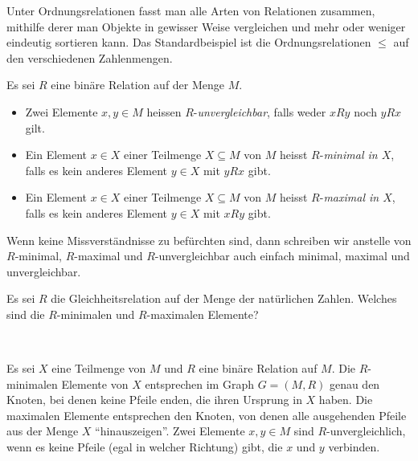     Unter Ordnungsrelationen fasst man alle Arten von Relationen zusammen, mithilfe derer man
    Objekte in gewisser Weise vergleichen und mehr oder weniger eindeutig sortieren kann. Das
    Standardbeispiel ist die Ordnungsrelationen $\leq$ auf den verschiedenen Zahlenmengen.

    \begin{df}\label{df:minimale elemente}
    Es sei $R$ eine binäre Relation auf der Menge $M$.
    \begin{itemize}
    \item Zwei Elemente $x,y\in M$ heissen $R$-\textit{unvergleichbar}, falls weder $xRy$ noch $yRx$ gilt.
    \item Ein Element $x\in X$ einer Teilmenge $X\subseteq M$ von $M$ heisst $R$-\textit{minimal in $X$}, falls es kein anderes Element $y\in X$ mit $yRx$ gibt.
    \item  Ein Element $x\in X$ einer Teilmenge $X\subseteq M$ von $M$ heisst $R$-\textit{maximal in $X$}, falls es kein anderes Element $y\in X$ mit $xRy$ gibt.
    \end{itemize}
    Wenn keine Missverständnisse zu befürchten sind, dann schreiben wir anstelle von $R$-minimal, $R$-maximal und $R$-unvergleichbar auch einfach minimal, maximal und unvergleichbar.
    \end{df}

    \begin{ueb}
        Es sei $R$ die Gleichheitsrelation auf der Menge der natürlichen Zahlen. Welches sind die $R$-minimalen und $R$-maximalen Elemente?
    \end{ueb}
    \begin{lsg}~
    \end{lsg}

    \begin{rk}
        Es sei $X$ eine Teilmenge von $M$ und $R$ eine binäre Relation auf $M$.
        Die $R$-minimalen Elemente von $X$ entsprechen im Graph $G=(M,R)$ genau den Knoten, bei
        denen keine Pfeile enden, die ihren Ursprung in $X$ haben. Die maximalen Elemente
        entsprechen den Knoten, von denen alle ausgehenden Pfeile aus der Menge $X$
        ``hinauszeigen''. Zwei Elemente $x,y\in M$ sind $R$-unvergleichlich, wenn es keine
        Pfeile (egal in welcher Richtung) gibt, die $x$ und $y$ verbinden.
    \end{rk}

